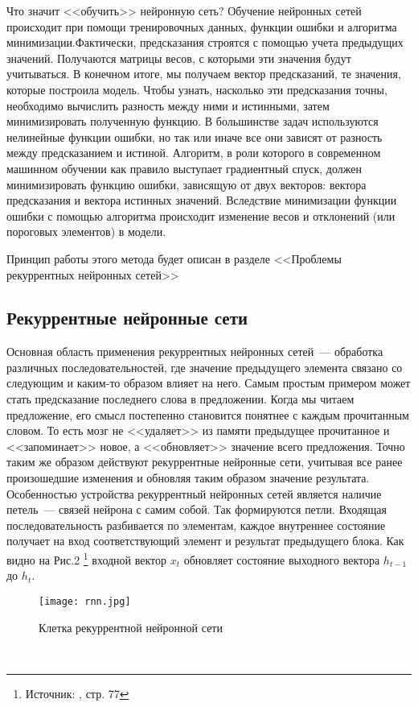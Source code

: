 \documentclass[12pt, a4paper]{article}
\begin{document}
Что значит <<обучить>> нейронную сеть?
Обучение нейронных сетей происходит при помощи тренировочных данных, функции ошибки и алгоритма минимизации.Фактически, предсказания строятся с помощью учета предыдущих значений. Получаются матрицы весов, с которыми эти значения будут учитываться. В конечном итоге, мы получаем вектор предсказаний, те значения, которые построила модель. Чтобы узнать, насколько эти предсказания точны, необходимо вычислить разность между ними и истинными, затем минимизировать полученную функцию. В большинстве задач используются нелинейные функции ошибки, но так или иначе все они зависят от разность между предсказанием и истиной. Алгоритм, в роли которого в современном машинном обучении как правило выступает градиентный спуск, должен минимизировать функцию ошибки, зависящую от двух векторов: вектора предсказания и вектора истинных значений. Вследствие минимизации функции ошибки с помощью алгоритма происходит изменение весов и отклонений (или пороговых элементов) в модели.

Принцип работы этого метода будет описан в разделе <<Проблемы рекуррентных нейронных сетей>>

\subsection{Рекуррентные нейронные сети}

Основная область применения рекуррентных нейронных сетей~--- обработка различных последовательностей, где значение предыдущего элемента связано со следующим и каким-то образом влияет на него. Самым простым примером может стать предсказание последнего слова в предложении. Когда мы читаем предложение, его смысл постепенно становится понятнее с каждым прочитанным словом. То есть мозг не  <<удаляет>>  из памяти предыдущее прочитанное и <<запоминает>> новое, а <<обновляет>> значение всего предложения. Точно таким же образом действуют рекуррентные нейронные сети, учитывая все ранее произошедшие изменения и обновляя таким образом значение результата.
Особенностью устройства рекуррентный нейронных сетей является наличие петель~--- связей нейрона с самим собой.
Так формируются петли. Входящая последовательность разбивается по элементам, каждое внутреннее состояние получает на вход соответствующий элемент и результат предыдущего блока. Как видно на Рис.2 \footnote{Источник: \cite{TensorFlow}, стр. 77} входной вектор $x_t$ обновляет состояние выходного вектора $h_{t-1}$ до $h_t$.
\begin{figure}[ht]
	\centering
	\texttt{[image: rnn.jpg]}
	\caption{Клетка рекуррентной нейронной сети}
\end{figure}\\
\end{document}
